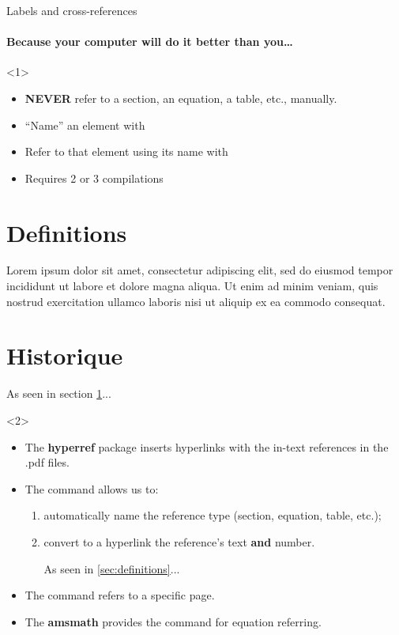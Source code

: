 \begin{frame}[fragile]{Labels and cross-references}
	\framesubtitle{Because your computer will do it better than you\ldots}
	\begin{onlyenv}
		\begin{itemize}
			\item \textbf{NEVER} refer to a section, an equation, a table, etc., manually.
			\item ``Name'' an element with 
			\item Refer to that element using its name with 
			\item Requires 2 or 3 compilations
		\end{itemize}
	
\begin{codesource}
	\section{Definitions}
		\label{sec:definitions}
	
		Lorem ipsum dolor sit amet, consectetur adipiscing elit, 
		sed do eiusmod tempor incididunt ut labore et dolore magna aliqua. 
		Ut enim ad minim veniam, quis nostrud exercitation ullamco laboris 
		nisi ut aliquip ex ea commodo consequat.
	
	\section{Historique}
		As seen in section \ref{sec:definitions}...
\end{codesource}
	\end{onlyenv}
	\begin{onlyenv}
		\begin{itemize}
			\item The \textbf{hyperref} package inserts hyperlinks with the in-text references
				in the .pdf files.
			\item The  command allows us to:
				\begin{enumerate}
					\item automatically name the reference type (section, equation, table, etc.);
					\item convert to a hyperlink the reference's text \textbf{and} number.
\begin{codesource}
	As seen in \autoref{sec:definitions}...
\end{codesource}
				\end{enumerate}
			\item The  command refers to a specific page.
			\item The \textbf{amsmath} provides the  command for
				equation referring.
		\end{itemize}
	\end{onlyenv}
\end{frame}